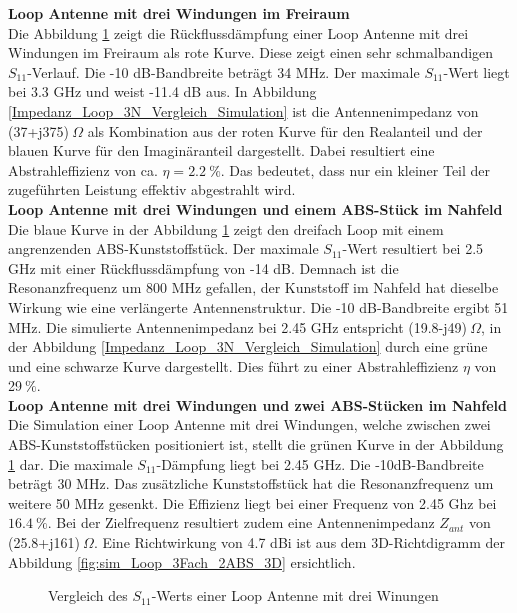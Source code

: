 \textbf{Loop Antenne mit drei Windungen im Freiraum}\\
Die Abbildung \ref{S11_Loop_3N_Vergleich_Simulation} zeigt die Rückflussdämpfung einer Loop Antenne mit drei Windungen im Freiraum als rote Kurve. Diese zeigt einen sehr schmalbandigen $S_{11}$-Verlauf. Die -10 dB-Bandbreite beträgt 34 MHz. Der maximale $S_{11}$-Wert liegt bei 3.3 GHz und weist -11.4 dB aus. In Abbildung \ref{Impedanz_Loop_3N_Vergleich_Simulation} ist die Antennenimpedanz von (37+j375)$\ \Omega$ als Kombination aus der roten Kurve für den Realanteil und der blauen Kurve für den Imaginäranteil dargestellt. Dabei resultiert eine Abstrahleffizienz von ca. $\eta=2.2\ \%$. Das bedeutet, dass nur ein kleiner Teil der zugeführten Leistung effektiv abgestrahlt wird.\\

\textbf{Loop Antenne mit drei Windungen und einem ABS-Stück im Nahfeld}\\
Die blaue Kurve in der Abbildung \ref{S11_Loop_3N_Vergleich_Simulation} zeigt den dreifach Loop mit einem angrenzenden ABS-Kunststoffstück. Der maximale $S_{11}$-Wert resultiert bei 2.5 GHz mit einer Rückflussdämpfung von -14 dB. Demnach ist die Resonanzfrequenz um 800 MHz gefallen, der Kunststoff im Nahfeld hat dieselbe Wirkung wie eine verlängerte Antennenstruktur. Die -10 dB-Bandbreite ergibt 51 MHz. Die simulierte Antennenimpedanz bei 2.45 GHz entspricht (19.8-j49)$\ \Omega$, in der Abbildung \ref{Impedanz_Loop_3N_Vergleich_Simulation} durch eine grüne und eine schwarze Kurve dargestellt. Dies führt zu einer Abstrahleffizienz $\eta$ von 29$\ \%$. \\

\textbf{Loop Antenne mit drei Windungen und zwei ABS-Stücken im Nahfeld}\\
Die Simulation einer Loop Antenne mit drei Windungen, welche zwischen zwei ABS-Kunststoffstücken positioniert ist, stellt die grünen Kurve in der Abbildung \ref{S11_Loop_3N_Vergleich_Simulation} dar. Die maximale $S_{11}$-Dämpfung liegt bei 2.45 GHz. Die -10dB-Bandbreite beträgt 30 MHz. Das zusätzliche Kunststoffstück hat die Resonanzfrequenz um weitere 50 MHz gesenkt. Die Effizienz liegt bei einer Frequenz von 2.45 Ghz bei $16.4\ \%$. Bei der Zielfrequenz resultiert zudem eine Antennenimpedanz $Z_{ant}$ von (25.8+j161)$\ \Omega$. Eine Richtwirkung von 4.7 dBi ist aus dem 3D-Richtdigramm der Abbildung \ref{fig:sim_Loop_3Fach_2ABS_3D} ersichtlich.
\newpage
\begin{figure}[!ht]
	\centering
	\begingroup
	
	\endgroup
	\caption{Vergleich des $S_{11}$-Werts einer Loop Antenne mit drei Winungen}
	\label{S11_Loop_3N_Vergleich_Simulation}
\end{figure}

